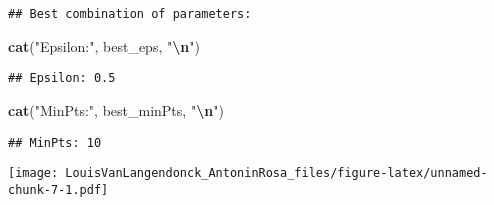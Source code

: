 \documentclass[
]{article}
\newenvironment{Shaded}{\begin{snugshade}}{\end{snugshade}}
\newcommand{\AttributeTok}[1]{\textcolor[rgb]{0.13,0.29,0.53}{#1}}
\newcommand{\DecValTok}[1]{\textcolor[rgb]{0.00,0.00,0.81}{#1}}
\newcommand{\FunctionTok}[1]{\textcolor[rgb]{0.13,0.29,0.53}{\textbf{#1}}}
\newcommand{\NormalTok}[1]{#1}
\newcommand{\OtherTok}[1]{\textcolor[rgb]{0.56,0.35,0.01}{#1}}
\newcommand{\SpecialCharTok}[1]{\textcolor[rgb]{0.81,0.36,0.00}{\textbf{#1}}}
\newcommand{\StringTok}[1]{\textcolor[rgb]{0.31,0.60,0.02}{#1}}
\begin{document}
\begin{verbatim}
## Best combination of parameters:
\end{verbatim}

\begin{Shaded}
\begin{Highlighting}[]
\FunctionTok{cat}\NormalTok{(}\StringTok{"Epsilon:"}\NormalTok{, best\_eps, }\StringTok{"}\SpecialCharTok{\textbackslash{}n}\StringTok{"}\NormalTok{)}
\end{Highlighting}
\end{Shaded}

\begin{verbatim}
## Epsilon: 0.5
\end{verbatim}

\begin{Shaded}
\begin{Highlighting}[]
\FunctionTok{cat}\NormalTok{(}\StringTok{"MinPts:"}\NormalTok{, best\_minPts, }\StringTok{"}\SpecialCharTok{\textbackslash{}n}\StringTok{"}\NormalTok{)}
\end{Highlighting}
\end{Shaded}

\begin{verbatim}
## MinPts: 10
\end{verbatim}

\begin{Shaded}
\end{Shaded}

\texttt{[image: LouisVanLangendonck\_AntoninRosa\_files/figure-latex/unnamed-chunk-7-1.pdf]}

\begin{Shaded}
\end{Shaded}
\end{document}
